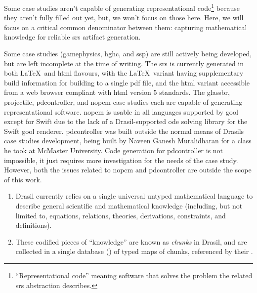 \caseStudiesCodeTable{}

Some case studies aren't capable of generating representational
code\footnote{``Representational code'' meaning software that solves the problem
      the related \acs{srs} abstraction describes.} because they aren't fully filled
out yet, but, we won't focus on those here. Here, we will focus on a critical
common denominator between them: capturing mathematical knowledge for reliable
\acs{srs} artifact generation.


Some case studies (\acs{gamephysics}, \acs{hghc}, and \acs{ssp}) are still
actively being developed, but are left incomplete at the time of writing. The
\acs{srs} is currently generated in both \LaTeX{}\ and \acs{html} flavours, with
the \LaTeX{}\ variant having supplementary build information for building to a
single \acs{pdf} file, and the \acs{html} variant accessible from a web browser
compliant with \acs{html} version 5 standards. The \acs{glassbr},
\acs{projectile}, \acs{pdcontroller}, and \acs{nopcm} case studies each are
capable of generating representational software. \acs{nopcm} is usable in all
languages supported by \acs{gool} except for Swift due to the lack of a
Drasil-supported \acs{ode} solving library for the Swift \acs{gool} renderer.
\acs{pdcontroller} was built outside the normal means of Drasils case studies
development, being built by Naveen Ganesh Muralidharan \cite{DrasilPR2289Naveen}
for a class he took at McMaster University. Code generation for
\acs{pdcontroller} is not impossible, it just requires more investigation for
the needs of the case study. However, both the issues related to \acs{nopcm} and
\acs{pdcontroller} are outside the scope of this work.

\begin{enumerate}

      \item Drasil currently relies on a single universal untyped mathematical
            language to describe general scientific and mathematical knowledge
            (including, but not limited to, equations, relations, theories,
            derivations, constraints, and definitions).

      \item These codified pieces of ``knowledge'' are known as \textit{chunks}
            in Drasil, and are collected in a single database
            () of typed maps of chunks, referenced by
            their .

\end{enumerate}



